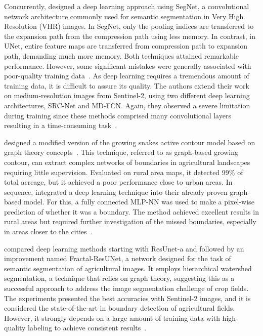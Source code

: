 \documentclass[12pt]{article}
\begin{document}
Concurrently, \citet{persello2019} designed a deep learning approach using SegNet, a convolutional network architecture commonly used for semantic segmentation in Very High Resolution (VHR) images. In SegNet, only the pooling indices are transferred to the expansion path from the compression path using less memory. In contrast, in UNet, entire feature maps are transferred from compression path to expansion path, demanding much more memory. Both techniques attained remarkable performance. However, some significant mistakes were generally associated with poor-quality training data~\citep{persello2019}. As deep learning requires a tremendous amount of training data, it is difficult to assure its quality. The authors extend their work on medium-resolution images from Sentinel-2, using two different deep learning architectures, SRC-Net and MD-FCN. Again, they observed a severe limitation during training since these methods comprised many convolutional layers resulting in a time-consuming task~\cite{persello2019,masoud2020}.

\citet{wagner2020} designed a modified version of the growing snakes active contour model based on graph theory concepts~\cite{wagner2020}. This technique, referred to as graph-based growing contour, can extract complex networks of boundaries in agricultural landscapes requiring little supervision. Evaluated on rural area maps, it detected 99\% of total acreage, but it achieved a poor performance close to urban areas. In sequence, \citet{wagner2020.2} integrated a deep learning technique into their already proven graph-based model. For this, a fully connected MLP-NN was used to make a pixel-wise prediction of whether it was a boundary. The method achieved excellent results in rural areas but required further investigation of the missed boundaries, especially in areas closer to the cities~\cite{wagner2020.2,wagner2020}.

\citet{waldner2020} compared deep learning methods starting with ResUnet-a and followed by an improvement named Fractal-ResUNet, a network designed for the task of semantic segmentation of agricultural images. It employs hierarchical watershed segmentation, a technique that relies on graph theory, suggesting this as a successful approach to address the image segmentation challenge of crop fields. The experiments presented the best accuracies with Sentinel-2 images, and it is considered the state-of-the-art in boundary detection of agricultural fields. However, it strongly depends on a large amount of training data with high-quality labeling to achieve consistent results~\cite{waldner2020,waldner2021}.
\end{document}
